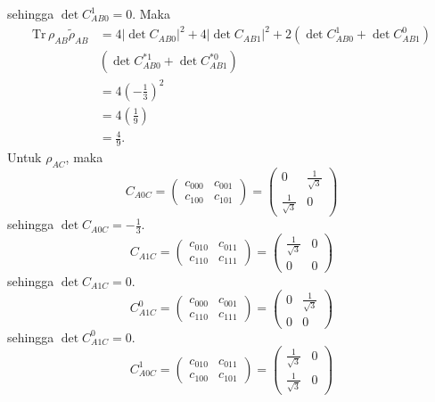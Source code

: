 sehingga $\det C_{AB0}^1 = 0$. Maka
\begin{equation}
	\begin{aligned}
		\mathrm{Tr}\,\rho_{AB}\tilde{\rho}_{AB}
		&=4 |\det C_{AB0}|^2+ 4 |\det C_{AB1}|^2+ 2 (\det C_{AB0}^1 + \det C_{AB1}^0)\\
		&(\det C^{*1}_{AB0} + \det C^{*0}_{AB1})\\
		&=4(-\frac{1}{3})^2\\
		&=4(\frac{1}{9})\\
		&=\frac{4}{9}.
	\end{aligned}
\end{equation}
Untuk $\rho_{AC}$, maka
\begin{equation}
	C_{A0C}=
	\begin{pmatrix}
		c_{000} & c_{001} \\
		c_{100} & c_{101}
	\end{pmatrix}=
	\begin{pmatrix}
		0 & \frac{1}{\sqrt{3}} \\
		\frac{1}{\sqrt{3}} & 0
	\end{pmatrix}
\end{equation}
sehingga $\det C_{A0C} = -\frac{1}{3}$.
\begin{equation}
	C_{A1C}=
	\begin{pmatrix}
		c_{010} & c_{011} \\
		c_{110} & c_{111}
	\end{pmatrix}=
	\begin{pmatrix}
		\frac{1}{\sqrt{3}} & 0 \\
		0 & 0
	\end{pmatrix}
\end{equation}
sehingga $\det C_{A1C} = 0$.
\begin{equation}
	C_{A1C}^0=
	\begin{pmatrix}
		c_{000} & c_{001} \\
		c_{110} & c_{111}
	\end{pmatrix}=
	\begin{pmatrix}
		0 & \frac{1}{\sqrt{3}} \\
		0 & 0
	\end{pmatrix}
\end{equation}
sehingga $\det C_{A1C}^0 = 0$.
\begin{equation}
	C_{A0C}^1=
	\begin{pmatrix}
		c_{010} & c_{011} \\
		c_{100} & c_{101}
	\end{pmatrix}=
	\begin{pmatrix}
		\frac{1}{\sqrt{3}} & 0 \\
		\frac{1}{\sqrt{3}} & 0
	\end{pmatrix}
\end{equation}
